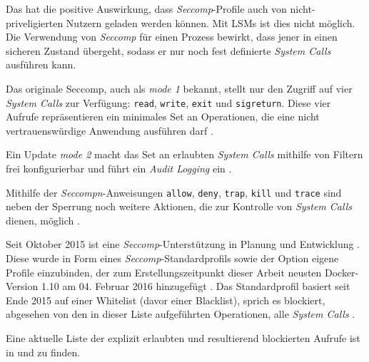 \documentclass[../main.tex]{subfiles}
\begin{document}
			Das hat die positive Auswirkung, dass \emph{Seccomp}-Profile auch von nicht-priveligierten Nutzern geladen werden können. Mit LSMs ist dies nicht möglich.
			Die Verwendung von \emph{Seccomp} für einen Prozess bewirkt, dass jener in einen \glqq{}sicheren\grqq{} Zustand übergeht, sodass er nur noch fest definierte \emph{System Calls} ausführen kann.



			Das originale Seccomp, auch als \emph{mode 1} bekannt, stellt nur den Zugriff auf vier \emph{System Calls} zur Verfügung: \texttt{read}, \texttt{write}, \texttt{exit} und \texttt{sigreturn}. Diese vier Aufrufe repräsentieren ein minimales Set an Operationen, die eine nicht vertrauenswürdige Anwendung ausführen darf \cite{linuxSecOverview}.

			Ein Update \emph{mode 2} macht das Set an erlaubten \emph{System Calls} mithilfe von Filtern frei konfigurierbar und führt ein \emph{Audit Logging} ein	\cite{linuxSecOverview}\cite{seccompGitDesc}.

			Mithilfe der \emph{Seccompn}-Anweisungen \texttt{allow}, \texttt{deny}, \texttt{trap}, \texttt{kill} und \texttt{trace} sind neben der Sperrung noch weitere Aktionen, die zur Kontrolle von \emph{System Calls} dienen, möglich \cite{docker110Security}.

			Seit Oktober 2015 ist eine \emph{Seccomp}-Unterstützung in Planung und Entwicklung \cite{githubGeneralSecProfiles}\cite{githubSeccompIntegration}. Diese wurde in Form eines \emph{Seccomp}-Standardprofils sowie der Option eigene Profile einzubinden, der zum Erstellungszeitpunkt dieser Arbeit neusten Docker-Version 1.10 am 04. Februar 2016 hinzugefügt \cite{githubDockerChangelog}\cite{githubSeccompDoc}
			\cite{githubSeccompProfile}\cite{docker110Security}. Das Standardprofil basiert seit Ende 2015 auf einer Whitelist (davor einer Blacklist), sprich es blockiert, abgesehen von den in dieser Liste aufgeführten Operationen, alle \emph{System Calls} \cite{githubSeccompDoc}.

			Eine aktuelle Liste der explizit erlaubten und resultierend blockierten Aufrufe ist in \cite{githubSeccompProfile} und \cite{githubSeccompDoc} zu finden.
\end{document}
